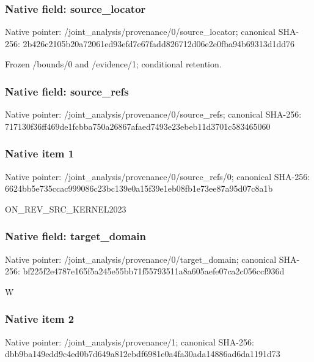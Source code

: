 \documentclass[10pt,a4paper]{article}
\begin{document}
\subsubsection{Native field: source\_\allowbreak{}locator}
Native pointer: /joint\_\allowbreak{}analysis/provenance/0/source\_\allowbreak{}locator; canonical SHA-256: 2b426c2105b20a72061ed93efd7e67fadd826712d06e2e0fba94b69313d1dd76

\begingroup\raggedright\sloppy Frozen /\allowbreak{}bounds/\allowbreak{}0 and /\allowbreak{}evidence/\allowbreak{}1;\allowbreak{} conditional retention.\par\endgroup

\subsubsection{Native field: source\_\allowbreak{}refs}
Native pointer: /joint\_\allowbreak{}analysis/provenance/0/source\_\allowbreak{}refs; canonical SHA-256: 717130f36ff469de1fcbba750a26867afaed7493e23ebeb11d3701c583465060

\subsubsection{Native item 1}
Native pointer: /joint\_\allowbreak{}analysis/provenance/0/source\_\allowbreak{}refs/0; canonical SHA-256: 6624bb5e735ccac999086c23bc139e0a15f39e1eb08fb1e73ee87a95d07c8a1b

\begingroup\raggedright\sloppy ON\_\allowbreak{}REV\_\allowbreak{}SRC\_\allowbreak{}KERNEL2023\par\endgroup

\subsubsection{Native field: target\_\allowbreak{}domain}
Native pointer: /joint\_\allowbreak{}analysis/provenance/0/target\_\allowbreak{}domain; canonical SHA-256: bf225f2e4787e165f5a245e55bb71f55793511a8a605aefe07ca2c056ccf936d

\begingroup\raggedright\sloppy W\par\endgroup

\subsubsection{Native item 2}
Native pointer: /joint\_\allowbreak{}analysis/provenance/1; canonical SHA-256: dbb9ba149edd9c4ed0b7d649a812ebdf6981e0a4fa30ada14886ad6da1191d73
\end{document}
